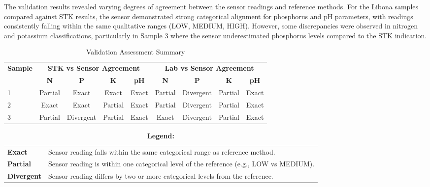 {	The validation results revealed varying degrees of agreement between the sensor readings and reference methods. For the Libona samples compared against STK results, the sensor demonstrated strong categorical alignment for phosphorus and pH parameters, with readings consistently falling within the same qualitative ranges (LOW, MEDIUM, HIGH). However, some discrepancies were observed in nitrogen and potassium classifications, particularly in Sample 3 where the sensor underestimated phosphorus levels compared to the STK indication.
	
	\begin{table}[H]
		\centering
		\renewcommand{\arraystretch}{1.2}
		\caption{Validation Assessment Summary}
		\label{tab:validation_summary}
		
		\begin{adjustbox}{max width=\textwidth}
			\begin{tabular}{lcccccccc}
				\toprule
				\multirow{2}{*}{\textbf{Sample}} & \multicolumn{4}{c}{\textbf{STK vs Sensor Agreement}} & \multicolumn{4}{c}{\textbf{Lab vs Sensor Agreement}} \\
				\cmidrule(lr){2-5} \cmidrule(lr){6-9}
				& \textbf{N} & \textbf{P} & \textbf{K} & \textbf{pH} & \textbf{N} & \textbf{P} & \textbf{K} & \textbf{pH} \\
				\midrule
				1 & Partial & Exact     & Exact   & Exact & Partial & Divergent & Partial & Exact \\
				2 & Exact   & Exact     & Partial & Exact & Partial & Divergent & Partial & Exact \\
				3 & Partial & Divergent & Partial & Exact & Exact   & Divergent & Partial & Exact \\
				\bottomrule
			\end{tabular}
		\end{adjustbox}
		
	\end{table}
	
	\begin{table}[H]
		\centering
		\renewcommand{\arraystretch}{1.3}
		\caption*{\textbf{Legend:}}
		\begin{tabular}{p{3cm} p{10cm}}
			\textbf{Exact} & Sensor reading falls within the same categorical range as reference method. \\[4pt]
			\textbf{Partial} & Sensor reading is within one categorical level of the reference (e.g., LOW vs MEDIUM). \\[4pt]
			\textbf{Divergent} & Sensor reading differs by two or more categorical levels from the reference. \\
		\end{tabular}
	\end{table}
	
}
